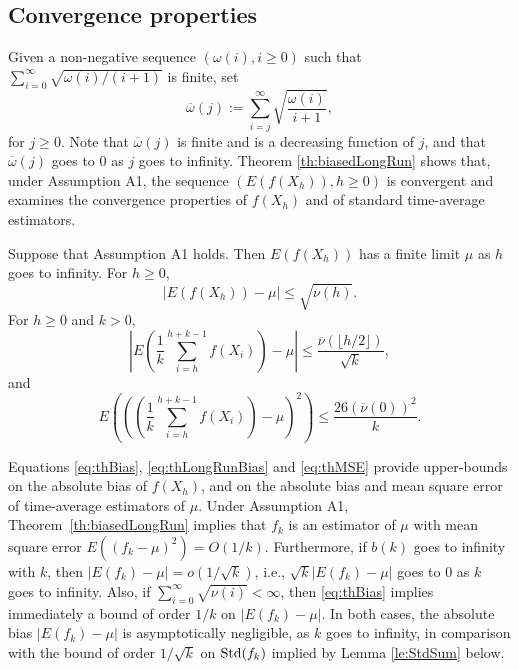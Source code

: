 \documentclass[a4paper,11pt]{article}
\begin{document}
\subsection{Convergence properties}\label{sub:conventionalLongRun}
Given a non-negative sequence \((\omega(i),i\geq0)\) such that \(\sum^{\infty}_{i=0}\sqrt{{\omega(i)}/(i+1)}\) is finite,  set
\begin{equation*}
\overline{\omega}(j):=\sum^{\infty}_{i=j}\sqrt{\frac{\omega(i)}{i+1}},
\end{equation*}   for \(j\ge0\). Note that \(\overline{\omega}(j)\)  is finite and is a decreasing function of \(j\), and that  \(\overline{\omega}(j)\)   goes to \(0\) as \(j\) goes to infinity. 
Theorem \ref{th:biasedLongRun} shows that, under Assumption A1, the sequence  \((E(f(X_{h})),h\ge0)\)  is convergent and examines the convergence properties of \(f(X_{h})\) and of  standard  time-average estimators.  
\begin{theorem}
\label{th:biasedLongRun}Suppose that Assumption A1 holds. Then \(E(f(X_{h}))\) has a finite limit \(\mu\)  as \(h\) goes to infinity. For \(h\ge 0\), \begin{equation}\label{eq:thBias}
|E(f(X_{h}))-\mu|\leq\sqrt{\nu(h)}.
\end{equation}For  \(h\ge 0\) and  \(k>0\),
 \begin{equation}\label{eq:thLongRunBias}
|E(\frac{1}{k}\sum^{h+k-1}_{i=h}f(X_{i}))-\mu|\leq \frac{\overline{\nu}(\lfloor h/2\rfloor)}{\sqrt{k}},
\end{equation}
and\begin{equation}\label{eq:thMSE}
E\left(\left((\frac{1}{k}\sum^{h+k-1}_{i=h}f(X_{i}))-\mu\right)^{2}\right)\leq\frac{26(\overline{\nu}(0))^{2}}{k}.
\end{equation}
\end{theorem}
Equations \eqref{eq:thBias},  \eqref{eq:thLongRunBias} and \eqref{eq:thMSE}  provide upper-bounds  on the absolute bias of \(f(X_{h})\),  and on the absolute  bias and  mean square error  of time-average estimators of \(\mu\).
Under Assumption A1, Theorem~\ref{th:biasedLongRun} implies that \(f_{k}\) is an estimator of \(\mu\) with mean square error \(E((f_{k}-\mu)^{2})=O(1/k)\). Furthermore, if \(b(k)\)  goes to infinity with \(k\), then  \(|E(f_{k})-\mu|=o(1/\sqrt{k})\), i.e.,   \(\sqrt{k}|E(f_{k})-\mu|\) goes to \(0\) as \(k\) goes to infinity.
Also, if  \(\sum^{\infty}_{i=0}\sqrt{{\nu(i)}}<\infty\), then \eqref{eq:thBias} implies immediately a bound of order \(1/k\) on \(|E(f_{k})-\mu|\). In both cases, the absolute bias  \(|E(f_{k})-\mu|\) is asymptotically negligible, as \(k\) goes to infinity, in comparison with the bound of  order \(1/\sqrt{k}\)   on \({\rm Std}(f_{k})\)  implied by Lemma \ref{le:StdSum} below. 
\end{document}
